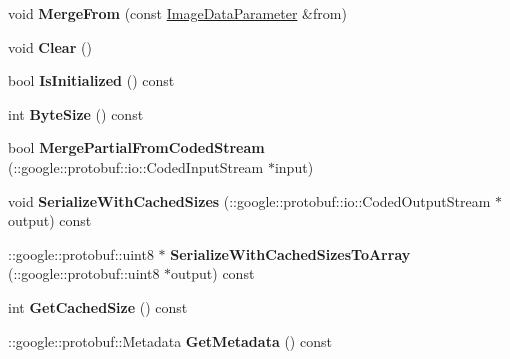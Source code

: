 \begin{DoxyCompactItemize}
void {\bfseries Merge\+From} (const \mbox{\hyperlink{classcaffe_1_1_image_data_parameter}{Image\+Data\+Parameter}} \&from)
\item 
\mbox{\label{classcaffe_1_1_image_data_parameter_a14132c786b77391664a2a65be6a8ea94}} 
void {\bfseries Clear} ()
\item 
\mbox{\label{classcaffe_1_1_image_data_parameter_a76b3891e2c8e6c2f0665d5bc7b70a87b}} 
bool {\bfseries Is\+Initialized} () const
\item 
\mbox{\label{classcaffe_1_1_image_data_parameter_a361edd992993587155eac0671bbb93f9}} 
int {\bfseries Byte\+Size} () const
\item 
\mbox{\label{classcaffe_1_1_image_data_parameter_a38b690d55f118caa6a92ee13f79a17b9}} 
bool {\bfseries Merge\+Partial\+From\+Coded\+Stream} (\+::google\+::protobuf\+::io\+::\+Coded\+Input\+Stream $\ast$input)
\item 
\mbox{\label{classcaffe_1_1_image_data_parameter_a85bc8110697d61879bee083d131fe415}} 
void {\bfseries Serialize\+With\+Cached\+Sizes} (\+::google\+::protobuf\+::io\+::\+Coded\+Output\+Stream $\ast$output) const
\item 
\mbox{\label{classcaffe_1_1_image_data_parameter_a881780633b672ff15bd46632dcf9f3c5}} 
\+::google\+::protobuf\+::uint8 $\ast$ {\bfseries Serialize\+With\+Cached\+Sizes\+To\+Array} (\+::google\+::protobuf\+::uint8 $\ast$output) const
\item 
\mbox{\label{classcaffe_1_1_image_data_parameter_a24208a0b0d2e5a56736c1319026f6db0}} 
int {\bfseries Get\+Cached\+Size} () const
\item 
\mbox{\label{classcaffe_1_1_image_data_parameter_ae58b5858fe9f6ab75cc3016c4c5f1485}} 
\+::google\+::protobuf\+::\+Metadata {\bfseries Get\+Metadata} () const
\item 
\mbox{\label{classcaffe_1_1_image_data_parameter_a7e2cded85ab061dbbf531bc722753cf5}} 

\end{DoxyCompactItemize}
